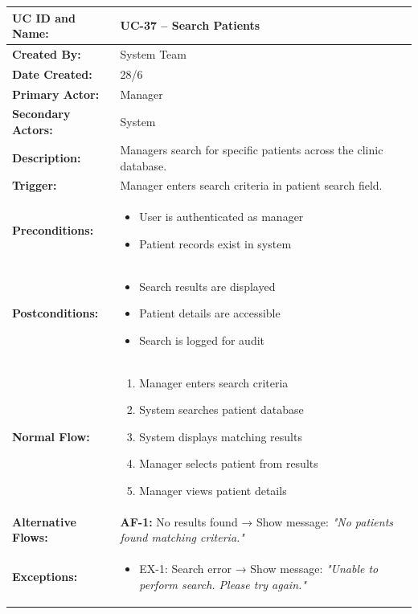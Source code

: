 \documentclass[12pt,a4paper]{article}
\begin{document}
\renewcommand{\arraystretch}{1.5}
\begin{longtable}{|p{4.5cm}|p{10.5cm}|}
\hline
\textbf{UC ID and Name:} & UC-37 – Search Patients \\
\hline
\textbf{Created By:} & System Team \\
\hline
\textbf{Date Created:} & 28/6 \\
\hline
\textbf{Primary Actor:} & Manager \\
\hline
\textbf{Secondary Actors:} & System \\
\hline
\textbf{Description:} & Managers search for specific patients across the clinic database. \\
\hline
\textbf{Trigger:} & Manager enters search criteria in patient search field. \\
\hline
\textbf{Preconditions:} &
\begin{itemize}
  \item User is authenticated as manager
  \item Patient records exist in system
\end{itemize} \\
\hline
\textbf{Postconditions:} &
\begin{itemize}
  \item Search results are displayed
  \item Patient details are accessible
  \item Search is logged for audit
\end{itemize} \\
\hline
\textbf{Normal Flow:} &
\begin{enumerate}
  \item Manager enters search criteria
  \item System searches patient database
  \item System displays matching results
  \item Manager selects patient from results
  \item Manager views patient details
\end{enumerate} \\
\hline
\textbf{Alternative Flows:} &
\textbf{AF-1:} No results found → Show message: \textit{"No patients found matching criteria."} \\
\hline
\textbf{Exceptions:} &
\begin{itemize}
  \item EX-1: Search error → Show message: \textit{"Unable to perform search. Please try again."}
\end{itemize} \\

\end{longtable}
\end{document}
